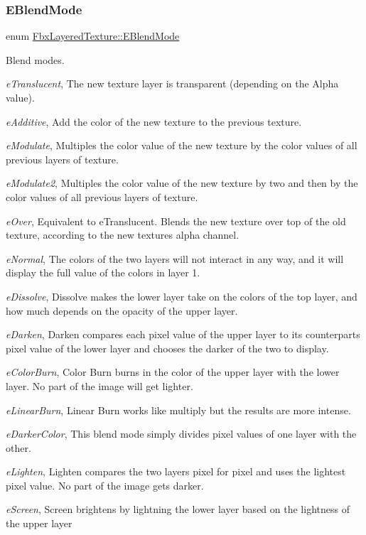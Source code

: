 \subsubsection{\texorpdfstring{E\+Blend\+Mode}{EBlendMode}}
{\footnotesize\ttfamily enum \hyperlink{class_fbx_layered_texture_af291d42b0329513909d2ddf48f56f5ba}{Fbx\+Layered\+Texture\+::\+E\+Blend\+Mode}}

Blend modes.
\begin{DoxyItemize}
\item {\itshape e\+Translucent}, The new texture layer is transparent (depending on the Alpha value).
\item {\itshape e\+Additive}, Add the color of the new texture to the previous texture.
\item {\itshape e\+Modulate}, Multiples the color value of the new texture by the color values of all previous layers of texture.
\item {\itshape e\+Modulate2}, Multiples the color value of the new texture by two and then by the color values of all previous layers of texture.
\item {\itshape e\+Over}, Equivalent to e\+Translucent. Blends the new texture over top of the old texture, according to the new texture\textquotesingle{}s alpha channel.
\item {\itshape e\+Normal}, The colors of the two layers will not interact in any way, and it will display the full value of the colors in layer 1.
\item {\itshape e\+Dissolve}, Dissolve makes the lower layer take on the colors of the top layer, and how much depends on the opacity of the upper layer.
\item {\itshape e\+Darken}, Darken compares each pixel value of the upper layer to its counterpart\textquotesingle{}s pixel value of the lower layer and chooses the darker of the two to display.
\item {\itshape e\+Color\+Burn}, Color Burn burns in the color of the upper layer with the lower layer. No part of the image will get lighter.
\item {\itshape e\+Linear\+Burn}, Linear Burn works like multiply but the results are more intense.
\item {\itshape e\+Darker\+Color}, This blend mode simply divides pixel values of one layer with the other.
\item {\itshape e\+Lighten}, Lighten compares the two layers pixel for pixel and uses the lightest pixel value. No part of the image gets darker.
\item {\itshape e\+Screen}, Screen brightens by lightning the lower layer based on the lightness of the upper layer

\end{DoxyItemize}

